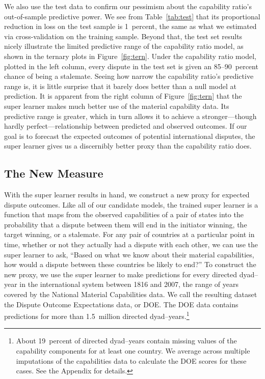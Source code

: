 We also use the test data to confirm our pessimism about the capability ratio's out-of-sample predictive power.
We see from Table~\ref{tab:test} that its proportional reduction in loss on the test sample is 1~percent, the same as what we estimated via cross-validation on the training sample.
Beyond that, the test set results nicely illustrate the limited predictive range of the capability ratio model, as shown in the ternary plots in Figure~\ref{fig:tern}.
Under the capability ratio model, plotted in the left column, every dispute in the test set is given an 85--90~percent chance of being a stalemate.
Seeing how narrow the capability ratio's predictive range is, it is little surprise that it barely does better than a null model at prediction.
It is apparent from the right column of Figure~\ref{fig:tern} that the super learner makes much better use of the material capability data.
Its predictive range is greater, which in turn allows it to achieve a stronger---though hardly perfect---relationship between predicted and observed outcomes.
If our goal is to forecast the expected outcomes of potential international disputes, the super learner gives us a discernibly better proxy than the capability ratio does.

\subsection{The New Measure}

With the super learner results in hand, we construct a new proxy for expected dispute outcomes.
Like all of our candidate models, the trained super learner is a function that maps from the observed capabilities of a pair of states into the probability that a dispute between them will end in the initiator winning, the target winning, or a stalemate.
For any pair of countries at a particular point in time, whether or not they actually had a dispute with each other, we can use the super learner to ask, ``Based on what we know about their material capabilities, how would a dispute between these countries be likely to end?''
To construct the new proxy, we use the super learner to make predictions for every directed dyad--year in the international system between 1816 and 2007, the range of years covered by the National Material Capabilities data.
We call the resulting dataset the Dispute Outcome Expectations data, or DOE.
The DOE data contains predictions for more than 1.5~million directed dyad--years.\footnote{
  About 19~percent of directed dyad--years contain missing values of the capability components for at least one country.
  We average across multiple imputations of the capabilities data to calculate the DOE scores for these cases.
  See the Appendix for details.
}

